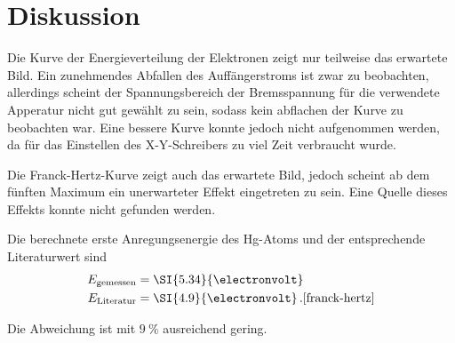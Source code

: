 \section{Diskussion}
\label{sec:Diskussion}

Die Kurve der Energieverteilung der Elektronen zeigt nur teilweise das erwartete Bild.
Ein zunehmendes Abfallen des Auffängerstroms ist zwar zu beobachten, allerdings scheint der Spannungsbereich der Bremsspannung für die verwendete Apperatur nicht gut gewählt zu sein, sodass kein abflachen der Kurve zu beobachten war.
Eine bessere Kurve konnte jedoch nicht aufgenommen werden, da für das Einstellen des X-Y-Schreibers zu viel Zeit verbraucht wurde.

Die Franck-Hertz-Kurve zeigt auch das erwartete Bild, jedoch scheint ab dem fünften Maximum ein unerwarteter Effekt eingetreten zu sein.
Eine Quelle dieses Effekts konnte nicht gefunden werden.

Die berechnete erste Anregungsenergie des Hg-Atoms und der entsprechende Literaturwert sind
\begin{align*}
    E_\text{gemessen} &= \SI{5.34}{\electronvolt} \\
    E_\text{Literatur} &= \SI{4.9}{\electronvolt} \,.\text{\cite{franck-hertz}}
\end{align*}

Die Abweichung ist mit $\SI{9}{\percent}$ ausreichend gering.
